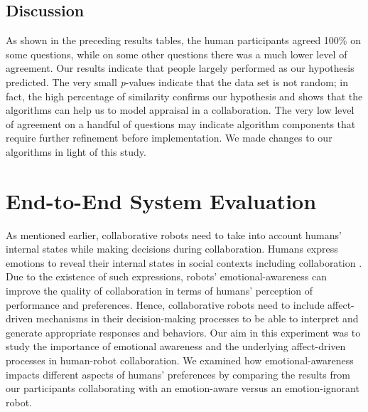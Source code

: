 \documentclass[12pt]{report}
\begin{document}
\subsection{Discussion}
\label{sec:discussion-crowdsourcing}
As shown in the preceding results tables, the human participants agreed 100\%
on some questions, while on some other questions there was a much lower level of
agreement. Our results indicate that people largely performed as our hypothesis
predicted. The very small \textit{p}-values indicate that the data set is not
random; in fact, the high percentage of similarity confirms our hypothesis and
shows that the algorithms can help us to model appraisal in a collaboration. The
very low level of agreement on a handful of questions may indicate algorithm
components that require further refinement before implementation. {\color{red}We
made changes to our algorithms in light of this study.}



\section{End-to-End System Evaluation}
\label{sec:end-to-end}

As mentioned earlier, collaborative robots need to take into account humans'
internal states while making decisions during collaboration. Humans express
emotions to reveal their internal states in social contexts including
collaboration \cite{breazeal:sociable-interactive-robots}. Due to the existence
of such expressions, robots' emotional-awareness can improve the quality of
collaboration in terms of humans' perception of performance and preferences.
Hence, collaborative robots need to include affect-driven mechanisms in their
decision-making processes to be able to interpret and generate appropriate
responses and behaviors. Our aim in this experiment was to study the importance
of emotional awareness and the underlying affect-driven processes in human-robot
collaboration. We examined how emotional-awareness impacts different aspects of
humans' preferences by comparing the results from our participants collaborating
with an emotion-aware versus an emotion-ignorant robot.
\end{document}
